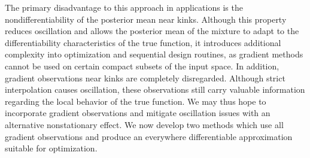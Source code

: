 \documentclass{article}
\numberwithin{equation}{section}
\begin{document}
The primary disadvantage to this approach in applications is the nondifferentiability of the posterior mean near kinks. Although this property reduces oscillation and allows the posterior mean of the mixture to adapt to the differentiability characteristics of the true function, it introduces additional complexity into optimization and sequential design routines, as gradient methods cannot be used on certain compact subsets of the input space. In addition, gradient observations near kinks are completely disregarded. Although strict interpolation causes oscillation, these observations still carry valuable information regarding the local behavior of the true function. We may thus hope to incorporate gradient observations and mitigate oscillation issues with an alternative nonstationary effect. We now develop two methods which use all gradient observations and produce an everywhere differentiable approximation suitable for optimization.
\end{document}
